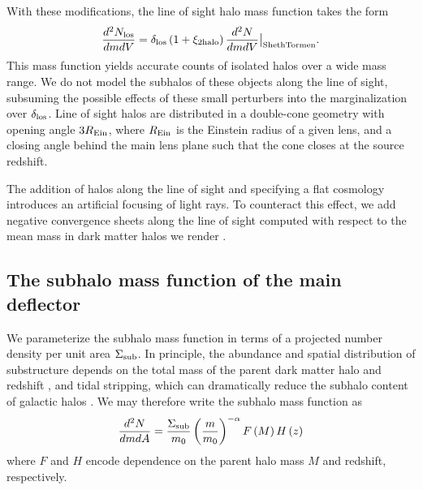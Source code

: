 With these modifications, the line of sight halo mass function takes the form
\begin{equation}
\label{eqn:losmfunc}
\frac{d^2N_{\rm{los}}}{dm  dV} = {\delta_{\rm{los}}} \left(1+ \xi_{\rm{2halo}} \right) \frac{d^2N}{dm  dV} \big \vert_{\rm{ShethTormen}}.
\end{equation}
This mass function yields accurate counts of isolated halos over a wide mass range. We do not model the subhalos of these objects along the line of sight, subsuming the possible effects of these small perturbers into the marginalization over $\delta_{\rm{los}}$. Line of sight halos are distributed in a double-cone geometry with opening angle $3 R_{\rm{Ein}}$, where $R_{\rm{Ein}}$ is the Einstein radius of a given lens, and a closing angle behind the main lens plane such that the cone closes at the source redshift. 

The addition of halos along the line of sight and specifying a flat cosmology introduces an artificial focusing of light rays. To counteract this effect, we add negative convergence sheets along the line of sight computed with respect to the mean mass in dark matter halos we render \citep[see][]{Birrer++17b}.

\subsection{The subhalo mass function of the main deflector}
\label{ssec:submfunc}
We parameterize the subhalo mass function in terms of a projected number density per unit area $\Sigma_{\rm{sub}}$. In principle, the abundance and spatial distribution of substructure depends on the total mass of the parent dark matter halo and redshift \citep{Gao++11,Han++16}, and tidal stripping, which can dramatically reduce the subhalo content of galactic halos \citep{DespVeg16,Han++16,GK++17,JiangvdB17,Richings++18}. We may therefore write the subhalo mass function as
\begin{equation}
\label{eqn:submfunc}
\frac{d^2N}{dmdA} = \frac{\Sigma_{\rm{sub}}}{m_0} \left(\frac{m}{m_0}\right)^{-\alpha} F\left(M\right) H\left(z\right)
\end{equation}
where $F$ and $H$ encode dependence on the parent halo mass $M$ and redshift, respectively.  

